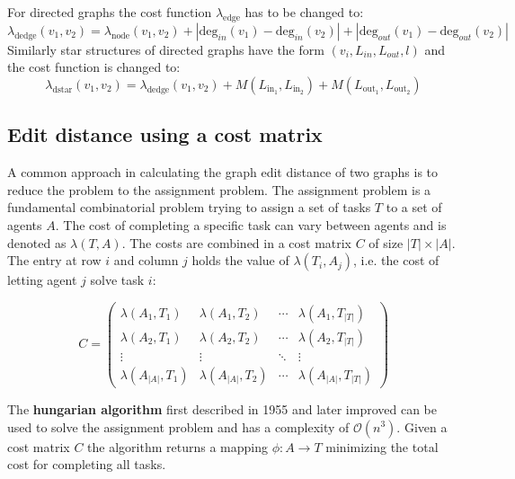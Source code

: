 \documentclass[
    12pt,                               %
    DIV=14,                     %
    parskip=half+,              %
    bigheadings,                %
    cleardoubleempty,   %
    halfparskip,                %
    ]{scrreprt} %
\begin{document}
For directed graphs the cost function $\lambda_{\text{edge}}$ has to be changed to:
\begin{equation}
	\lambda_{\text{dedge}}(v_1, v_2) = \lambda_{\text{node}}(v_1, v_2) + |\text{deg}_{in}(v_1) - \text{deg}_{in}(v_2)| + |\text{deg}_{out}(v_1) - \text{deg}_{out}(v_2)|
\end{equation}
Similarly star structures of directed graphs have the form $(v_i, L_{in}, L_{out}, l)$ and the cost function is changed to:
\begin{equation}
	\lambda_{\text{dstar}}(v_1, v_2) = \lambda_{\text{dedge}}(v_1, v_2) + M(L_{\text{in}_1}, L_{\text{in}_2}) + M(L_{\text{out}_1}, L_{\text{out}_2})
\end{equation}

\subsection{Edit distance using a cost matrix} \label{sec:assign}
A common approach in calculating the graph edit distance of two graphs is to reduce the problem to the assignment problem. The assignment problem is a fundamental combinatorial problem trying to assign a set of tasks $T$ to a set of agents $A$. The cost of completing a specific task can vary between agents and is denoted as $\lambda(T, A)$. The costs are combined in a cost matrix $C$ of size $|T| \times |A|$. The entry at row $i$ and column $j$ holds the value of $\lambda(T_i, A_j)$, i.e. the cost of letting agent $j$ solve task $i$:

\begin{equation}
	C =
	\begin{pmatrix}
		\lambda(A_1, T_1) & \lambda(A_1, T_2) & \cdots & \lambda(A_1, T_{|T|}) \\
		\lambda(A_2, T_1) & \lambda(A_2, T_2) & \cdots & \lambda(A_2, T_{|T|}) \\
		\vdots  & \vdots  & \ddots & \vdots  \\
		\lambda(A_{|A|}, T_1) & \lambda(A_{|A|}, T_2) & \cdots & \lambda(A_{|A|}, T_{|T|})
	\end{pmatrix}
\end{equation}

The \textbf{hungarian algorithm}\cite{hungarian1} first described in 1955 and later improved\cite{hungarian2,hungarian3,hungarian4} can be used to solve the assignment problem and has a complexity of $\mathcal{O}(n^3)$. Given a cost matrix $C$ the algorithm returns a mapping $\phi: A \rightarrow T$ minimizing the total cost for completing all tasks.
\end{document}
